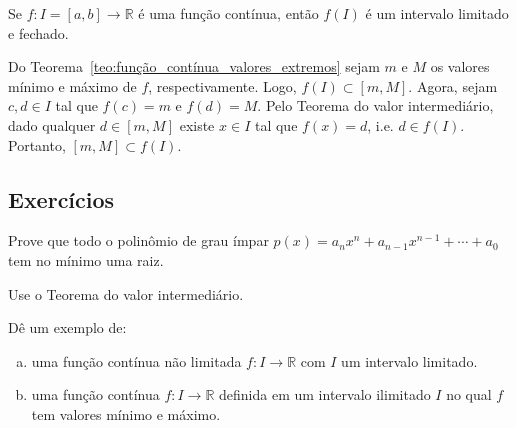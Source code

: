 \begin{teo}
  Se $f:I=[a, b]\to\mathbb{R}$ é uma função contínua, então $f(I)$ é um intervalo limitado e fechado.
\end{teo}
\begin{dem}
  Do Teorema~\ref{teo:função_contínua_valores_extremos} sejam $m$ e $M$ os valores mínimo e máximo de $f$, respectivamente. Logo, $f(I) \subset [m, M]$. Agora, sejam $c,d\in I$ tal que $f(c)=m$ e $f(d)=M$. Pelo Teorema do valor intermediário, dado qualquer $d\in [m, M]$ existe $x\in I$ tal que $f(x)=d$, i.e. $d\in f(I)$. Portanto, $[m, M]\subset f(I)$.
\end{dem}

\subsection*{Exercícios}

\begin{exer}
  Prove que todo o polinômio de grau ímpar $p(x) = a_nx^{n} + a_{n-1}x^{n-1} + \cdots + a_0$ tem no mínimo uma raiz.
\end{exer}
\begin{resp}
  Use o Teorema do valor intermediário.
\end{resp}

\begin{exer}
  Dê um exemplo de:
  \begin{enumerate}[a)]
  \item uma função contínua não limitada $f:I\to\mathbb{R}$ com $I$ um intervalo limitado.
  \item uma função contínua $f:I\to\mathbb{R}$ definida em um intervalo ilimitado $I$ no qual $f$ tem valores mínimo e máximo.
  \end{enumerate}
\end{exer}
